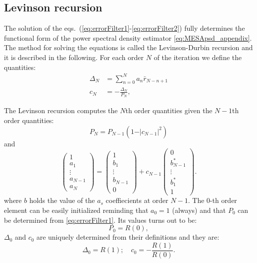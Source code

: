 \documentclass[twocolumn,showpacs,preprintnumbers,nofootinbib,prd,
superscriptaddress,10pt]{revtex4-1}
\begin{document}
\subsection{Levinson recursion} \label{sec:LevinsonRecursion}
The solution of the eqs.~(\ref{eq:errorFilter1}-\ref{eq:errorFilter2}) fully determines the functional form of the power spectral density estimator \eqref{eq:MESApsd_appendix}.
The method for solving the equations is called the Levinson-Durbin recursion \cite{doi:10.1002/sapm1946251261} and it is described in the following.
For each order $N$ of the iteration we define the quantities:
\begin{align}
\Delta_N &= \sum_{n = 0}^{N} a_n \bar{r}_{N - n + 1} \\ 
c_N &= - \frac{\Delta_N}{P_N},
\end{align}

The Levinson recursion computes the $N$th order quantities given the $N-1$th order quantities: 
\begin{equation} \label{eq:Levinson1}
P_N = P_{N -1}\left(1 - \vert c_{N - 1} \vert ^2\right)
\end{equation}
and 
\begin{equation} \label{eq:Levinson2}
\begin{pmatrix}
1 \\ a_1 \\ \vdots \\ a_{N - 1} \\ a_N
\end{pmatrix}
= 
\begin{pmatrix}
1 \\ b_1 \\ \vdots \\ b_{N -1} \\ 0
\end{pmatrix}
+ c_{N-1}
\begin{pmatrix}
0 \\ b_{N -1}^* \\ \vdots \\ b^*_1 \\ 1
\end{pmatrix}. 
\end{equation}
where $b$ holds the value of the $a_s$ coeffiecients at order $N-1$. 
The 0-th order element can be easily initialized reminding that $a_0 = 1$ (always) and that $P_0$ can be determined from \eqref{eq:errorFilter1}.
Its values turns out to be: 
\begin{equation}
P_0 = R(0),
\end{equation}
$\Delta_0$ and $c_0$ are uniquely determined from their definitions and they are:
\begin{equation}
\Delta_0 = R(1); \quad c_0 = -\frac{R(1)}{R(0)}. 
\end{equation}
\end{document}
